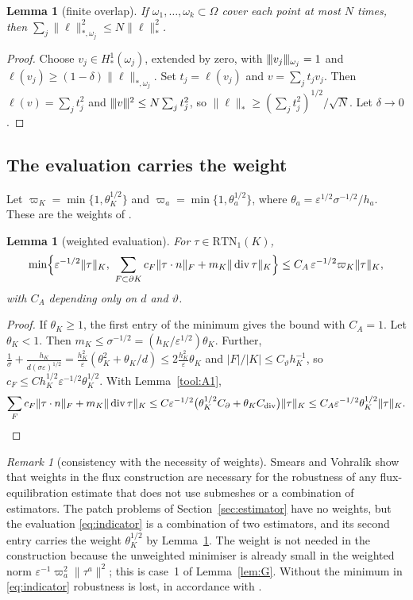 \documentclass[11pt]{article}
\newcommand{\tnorm}[1]{\lvert\kern-0.25ex\lvert\kern-0.25ex\lvert #1\rvert\kern-0.25ex\rvert\kern-0.25ex\rvert}
\newcommand{\eps}{\varepsilon}
\newcommand{\RTN}{\mathrm{RTN}_1}
\newcommand{\dv}{\operatorname{div}}
\theoremstyle{plain}
\newtheorem{lemma}[theorem]{Lemma}
\theoremstyle{remark}
\newtheorem{remark}[theorem]{Remark}
\numberwithin{equation}{section}
\begin{document}
\begin{lemma}[finite overlap]\label{tool:A6}
If $\omega_1,\dots,\omega_k\subset\Omega$ cover each point at most $N$ times, then
$\sum_j\|\ell\|_{*,\omega_j}^2\le N\|\ell\|_*^2$.
\end{lemma}

\begin{proof}
Choose $v_j\in H^1_*(\omega_j)$, extended by zero, with $\tnorm{v_j}_{\omega_j}=1$ and
$\ell(v_j)\ge(1-\delta)\|\ell\|_{*,\omega_j}$. Set $t_j=\ell(v_j)$ and $v=\sum_jt_jv_j$. Then
$\ell(v)=\sum_jt_j^2$ and $\tnorm{v}^2\le N\sum_jt_j^2$, so
$\|\ell\|_*\ge(\sum_jt_j^2)^{1/2}/\sqrt N$. Let $\delta\to0$.
\end{proof}

\subsection{The evaluation carries the weight}

Let $\varpi_K=\min\{1,\theta_K^{1/2}\}$ and $\varpi_a=\min\{1,\theta_a^{1/2}\}$, where
$\theta_a=\eps^{1/2}\sigma^{-1/2}/h_a$. These are the weights of \cite{SV20}.

\begin{lemma}[weighted evaluation]\label{lem:A}
For $\tau\in\RTN(K)$,
\[
  \min\Bigl\{\eps^{-1/2}\|\tau\|_K,\ \sum_{F\subset\partial K}c_F\|\tau\cdot n\|_F+m_K\|\dv\tau\|_K\Bigr\}
  \le C_A\,\eps^{-1/2}\varpi_K\|\tau\|_K,
\]
with $C_A$ depending only on $d$ and $\vartheta$.
\end{lemma}

\begin{proof}
If $\theta_K\ge1$, the first entry of the minimum gives the bound with $C_A=1$. Let $\theta_K<1$.
Then $m_K\le\sigma^{-1/2}=(h_K/\eps^{1/2})\theta_K$. Further,
$\frac1\sigma+\frac{h_K}{d(\sigma\eps)^{1/2}}=\frac{h_K^2}{\eps}(\theta_K^2+\theta_K/d)\le2\frac{h_K^2}{\eps}\theta_K$
and $|F|/|K|\le C_\vartheta h_K^{-1}$, so $c_F\le Ch_K^{1/2}\eps^{-1/2}\theta_K^{1/2}$. With
Lemma~\ref{tool:A1},
\[
  \sum_Fc_F\|\tau\cdot n\|_F+m_K\|\dv\tau\|_K
  \le C\eps^{-1/2}\bigl(\theta_K^{1/2}C_\partial+\theta_KC_{\dv}\bigr)\|\tau\|_K
  \le C_A\eps^{-1/2}\theta_K^{1/2}\|\tau\|_K.\qedhere
\]
\end{proof}

\begin{remark}[consistency with the necessity of weights]\label{rem:weights}
Smears and Vohral\'ik \cite{SV20} show that weights in the flux construction are necessary for the
robustness of any flux-equilibration estimate that does not use submeshes or a combination of
estimators. The patch problems of Section~\ref{sec:estimator} have no weights, but the evaluation
\eqref{eq:indicator} is a combination of two estimators, and its second entry carries the weight
$\theta_K^{1/2}$ by Lemma~\ref{lem:A}. The weight is not needed in the construction because the
unweighted minimiser is already small in the weighted norm $\eps^{-1}\varpi_a^2\|\tau^a\|^2$; this is
case~1 of Lemma~\ref{lem:G}. Without the minimum in \eqref{eq:indicator} robustness is lost, in
accordance with \cite{SV20}.
\end{remark}
\end{document}
